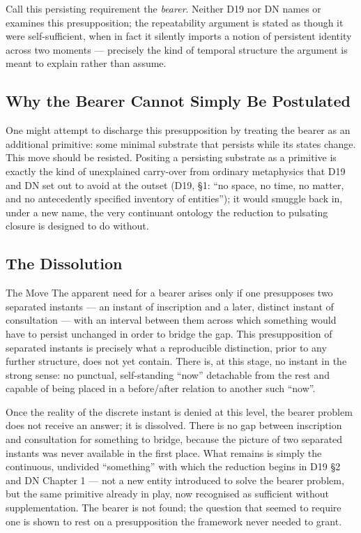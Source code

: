 \documentclass[11pt,a4paper]{article}
\begin{document}
Call this persisting requirement the \emph{bearer}. Neither D19 nor DN names or examines this presupposition; the repeatability argument is stated as though it were self-sufficient, when in fact it silently imports a notion of persistent identity across two moments --- precisely the kind of temporal structure the argument is meant to explain rather than assume.

\subsection{Why the Bearer Cannot Simply Be Postulated}

One might attempt to discharge this presupposition by treating the bearer as an additional primitive: some minimal substrate that persists while its states change. This move should be resisted. Positing a persisting substrate as a primitive is exactly the kind of unexplained carry-over from ordinary metaphysics that D19 and DN set out to avoid at the outset (D19, \S 1: ``no space, no time, no matter, and no antecedently specified inventory of entities''); it would smuggle back in, under a new name, the very continuant ontology the reduction to pulsating closure is designed to do without.

\subsection{The Dissolution}

\begin{argumentbox}{The Move}
The apparent need for a bearer arises only if one presupposes two separated instants --- an instant of inscription and a later, distinct instant of consultation --- with an interval between them across which something would have to persist unchanged in order to bridge the gap. This presupposition of separated instants is precisely what a reproducible distinction, prior to any further structure, does not yet contain. There is, at this stage, no instant in the strong sense: no punctual, self-standing ``now'' detachable from the rest and capable of being placed in a before/after relation to another such ``now''.
\end{argumentbox}

\begin{resolutionbox}
Once the reality of the discrete instant is denied at this level, the bearer problem does not receive an answer; it is dissolved. There is no gap between inscription and consultation for something to bridge, because the picture of two separated instants was never available in the first place. What remains is simply the continuous, undivided ``something'' with which the reduction begins in D19 \S 2 and DN Chapter 1 --- not a new entity introduced to solve the bearer problem, but the same primitive already in play, now recognised as sufficient without supplementation. The bearer is not found; the question that seemed to require one is shown to rest on a presupposition the framework never needed to grant.
\end{resolutionbox}
\end{document}
